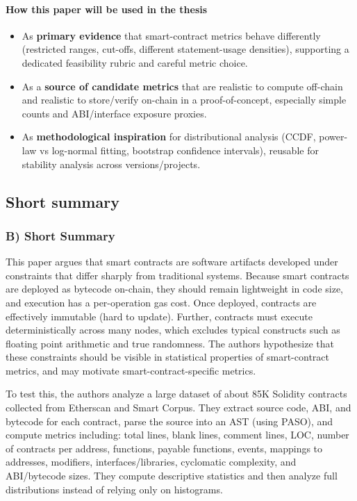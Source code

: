 \documentclass[11pt,a4paper]{article}
\begin{document}
\paragraph{How this paper will be used in the thesis}
\begin{itemize}[leftmargin=*]
  \item As \textbf{primary evidence} that smart-contract metrics behave differently (restricted ranges, cut-offs, different statement-usage densities), supporting a dedicated feasibility rubric and careful metric choice.
  \item As a \textbf{source of candidate metrics} that are realistic to compute off-chain and realistic to store/verify on-chain in a proof-of-concept, especially simple counts and ABI/interface exposure proxies.
  \item As \textbf{methodological inspiration} for distributional analysis (CCDF, power-law vs log-normal fitting, bootstrap confidence intervals), reusable for stability analysis across versions/projects.
\end{itemize}

\subsection{Short summary}
\subsubsection*{B) Short Summary}
This paper argues that smart contracts are software artifacts developed under constraints that differ sharply from traditional systems. Because smart contracts are deployed as bytecode on-chain, they should remain lightweight in code size, and execution has a per-operation gas cost. Once deployed, contracts are effectively immutable (hard to update). Further, contracts must execute deterministically across many nodes, which excludes typical constructs such as floating point arithmetic and true randomness. The authors hypothesize that these constraints should be visible in statistical properties of smart-contract metrics, and may motivate smart-contract-specific metrics.

To test this, the authors analyze a large dataset of about 85K Solidity contracts collected from Etherscan and Smart Corpus. They extract source code, ABI, and bytecode for each contract, parse the source into an AST (using PASO), and compute metrics including: total lines, blank lines, comment lines, LOC, number of contracts per address, functions, payable functions, events, mappings to addresses, modifiers, interfaces/libraries, cyclomatic complexity, and ABI/bytecode sizes. They compute descriptive statistics and then analyze full distributions instead of relying only on histograms.
\end{document}
